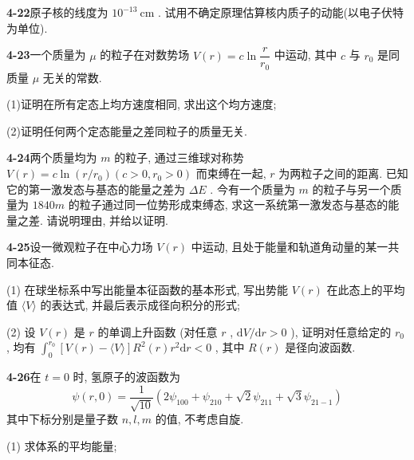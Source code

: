 \vfill

\newpage

\textbf{4-22}\quad 原子核的线度为 $\displaystyle 10^{-13} \mathrm{~cm}$ . 试用不确定原理估算核内质子的动能(以电子伏特为单位).

\vfill

\newpage

\textbf{4-23}\quad 一个质量为 $\displaystyle \mu$ 的粒子在对数势场 $\displaystyle V(r) = c\ln \dfrac{r}{r_0}$ 中运动, 其中 $\displaystyle c$ 与 $\displaystyle r_0$ 是同质量 $\displaystyle \mu$ 无关的常数.

(1)证明在所有定态上均方速度相同, 求出这个均方速度;

(2)证明任何两个定态能量之差同粒子的质量无关.

\vfill

\newpage

\textbf{4-24}\quad 两个质量均为 $\displaystyle m$ 的粒子, 通过三维球对称势 $\displaystyle V(r) = c \ln (r / r_0) (c > 0, r_0 > 0)$ 而束缚在一起, $\displaystyle r$ 为两粒子之间的距离. 已知它的第一激发态与基态的能量之差为 $\displaystyle \Delta E$ . 今有一个质量为 $\displaystyle m$ 的粒子与另一个质量为 $\displaystyle 1840m$ 的粒子通过同一位势形成束缚态, 求这一系统第一激发态与基态的能量之差. 请说明理由, 并给以证明.

\vfill

\newpage

\textbf{4-25}\quad 设一微观粒子在中心力场 $\displaystyle V(r)$ 中运动, 且处于能量和轨道角动量的某一共同本征态.

(1) 在球坐标系中写出能量本征函数的基本形式, 写出势能 $\displaystyle V(r)$ 在此态上的平均值 $\displaystyle \langle V\rangle$ 的表达式, 并最后表示成径向积分的形式;

(2) 设 $\displaystyle V(r)$ 是 $\displaystyle r$ 的单调上升函数 (对任意 $\displaystyle r$ , $\displaystyle \mathrm{d}V / \mathrm{d}r > 0$ ), 证明对任意给定的 $\displaystyle r_0$ , 均有 $\displaystyle \int_0^{r_0}[V(r) - \langle V\rangle]R^2 (r)r^2\mathrm{d}r < 0$ , 其中 $\displaystyle R(r)$ 是径向波函数.

\vfill

\newpage

\textbf{4-26}\quad 在 $\displaystyle t = 0$ 时, 氢原子的波函数为
$$
\psi (r, 0) = \dfrac {1}{\sqrt {1 0}} \left(2 \psi_ {1 0 0} + \psi_ {2 1 0} + \sqrt {2} \psi_ {2 1 1} + \sqrt {3} \psi_ {2 1 - 1}\right)
$$
其中下标分别是量子数 $\displaystyle n, l, m$ 的值, 不考虑自旋.

(1) 求体系的平均能量;

